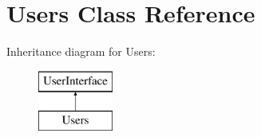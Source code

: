 \hypertarget{class_app_1_1_entity_1_1_users}{}\section{Users Class Reference}
\label{class_app_1_1_entity_1_1_users}
Inheritance diagram for Users\+:\begin{figure}[H]
\begin{center}
\leavevmode
\includegraphics[height=2.000000cm]{class_app_1_1_entity_1_1_users}
\end{center}
\end{figure}
